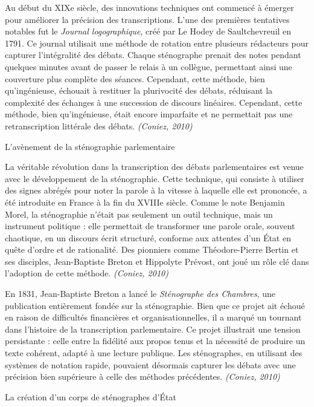 Au début du XIXe siècle, des innovations techniques ont commencé à émerger pour améliorer la précision des transcriptions. L'une des premières tentatives notables fut le \emph{Journal logographique}, créé par Le Hodey de Saultchevreuil en 1791. Ce journal utilisait une méthode de rotation entre plusieurs rédacteurs pour capturer l'intégralité des débats. Chaque sténographe prenait des notes pendant quelques minutes avant de passer le relais à un collègue, permettant ainsi une couverture plus complète des séances. Cependant, cette méthode, bien qu’ingénieuse, échouait à restituer la plurivocité des débats, réduisant la complexité des échanges à une succession de discours linéaires. Cependant, cette méthode, bien qu'ingénieuse, était encore imparfaite et ne permettait pas une retranscription littérale des débats. \emph{(Coniez, 2010)}

 L'avènement de la sténographie parlementaire

La véritable révolution dans la transcription des débats parlementaires est venue avec le développement de la sténographie. Cette technique, qui consiste à utiliser des signes abrégés pour noter la parole à la vitesse à laquelle elle est prononcée, a été introduite en France à la fin du XVIIIe siècle. Comme le note Benjamin Morel, la sténographie n’était pas seulement un outil technique, mais un instrument politique : elle permettait de transformer une parole orale, souvent chaotique, en un discours écrit structuré, conforme aux attentes d’un État en quête d’ordre et de rationalité. Des pionniers comme Théodore-Pierre Bertin et ses disciples, Jean-Baptiste Breton et Hippolyte Prévost, ont joué un rôle clé dans l'adoption de cette méthode. \emph{(Coniez, 2010)}

En 1831, Jean-Baptiste Breton a lancé le \emph{Sténographe des Chambres}, une publication entièrement fondée sur la sténographie. Bien que ce projet ait échoué en raison de difficultés financières et organisationnelles, il a marqué un tournant dans l'histoire de la transcription parlementaire. Ce projet illustrait une tension persistante : celle entre la fidélité aux propos tenus et la nécessité de produire un texte cohérent, adapté à une lecture publique. Les sténographes, en utilisant des systèmes de notation rapide, pouvaient désormais capturer les débats avec une précision bien supérieure à celle des méthodes précédentes. \emph{(Coniez, 2010)}

 La création d'un corps de sténographes d'État

